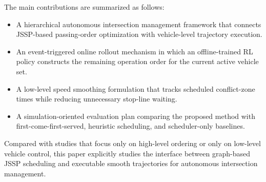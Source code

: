 The main contributions are summarized as follows:
\begin{addedblock}
\begin{itemize}
  \item A hierarchical autonomous intersection management framework that connects JSSP-based passing-order optimization with vehicle-level trajectory execution.
  \item An event-triggered online rollout mechanism in which an offline-trained RL policy constructs the remaining operation order for the current active vehicle set.
  \item A low-level speed smoothing formulation that tracks scheduled conflict-zone times while reducing unnecessary stop-line waiting.
  \item A simulation-oriented evaluation plan comparing the proposed method with first-come-first-served, heuristic scheduling, and scheduler-only baselines.
\end{itemize}
Compared with studies that focus only on high-level ordering or only on low-level vehicle control, this paper explicitly studies the interface between graph-based JSSP scheduling and executable smooth trajectories for autonomous intersection management.
\end{addedblock}



